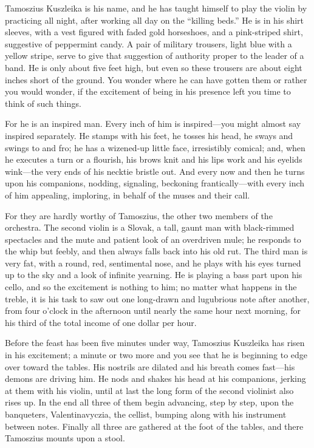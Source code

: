 \documentclass[
]{book}
\theoremstyle{definition}
\theoremstyle{definition}
\theoremstyle{definition}
\theoremstyle{definition}
\theoremstyle{remark}
\begin{document}
Tamoszius Kuszleika is his name, and he has taught himself to play the violin by practicing all night, after working all day on the ``killing beds.'' He is in his shirt sleeves, with a vest figured with faded gold horseshoes, and a pink-striped shirt, suggestive of peppermint candy. A pair of military trousers, light blue with a yellow stripe, serve to give that suggestion of authority proper to the leader of a band. He is only about five feet high, but even so these trousers are about eight inches short of the ground. You wonder where he can have gotten them or rather you would wonder, if the excitement of being in his presence left you time to think of such things.

For he is an inspired man. Every inch of him is inspired---you might almost say inspired separately. He stamps with his feet, he tosses his head, he sways and swings to and fro; he has a wizened-up little face, irresistibly comical; and, when he executes a turn or a flourish, his brows knit and his lips work and his eyelids wink---the very ends of his necktie bristle out. And every now and then he turns upon his companions, nodding, signaling, beckoning frantically---with every inch of him appealing, imploring, in behalf of the muses and their call.

For they are hardly worthy of Tamoszius, the other two members of the orchestra. The second violin is a Slovak, a tall, gaunt man with black-rimmed spectacles and the mute and patient look of an overdriven mule; he responds to the whip but feebly, and then always falls back into his old rut. The third man is very fat, with a round, red, sentimental nose, and he plays with his eyes turned up to the sky and a look of infinite yearning. He is playing a bass part upon his cello, and so the excitement is nothing to him; no matter what happens in the treble, it is his task to saw out one long-drawn and lugubrious note after another, from four o'clock in the afternoon until nearly the same hour next morning, for his third of the total income of one dollar per hour.

Before the feast has been five minutes under way, Tamoszius Kuszleika has risen in his excitement; a minute or two more and you see that he is beginning to edge over toward the tables. His nostrils are dilated and his breath comes fast---his demons are driving him. He nods and shakes his head at his companions, jerking at them with his violin, until at last the long form of the second violinist also rises up. In the end all three of them begin advancing, step by step, upon the banqueters, Valentinavyczia, the cellist, bumping along with his instrument between notes. Finally all three are gathered at the foot of the tables, and there Tamoszius mounts upon a stool.
\end{document}
